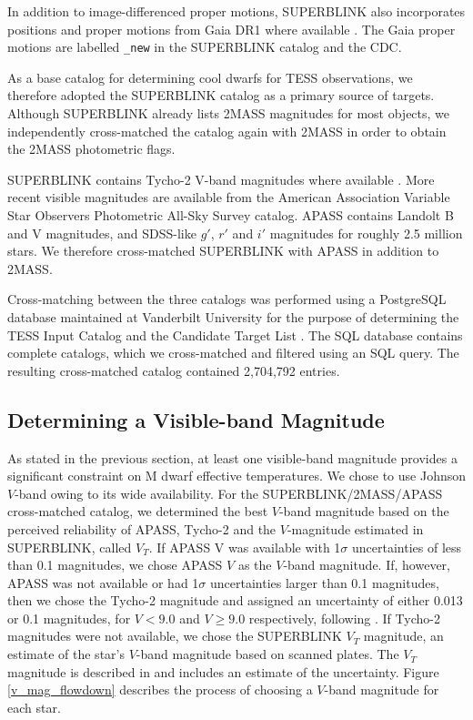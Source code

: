 \documentclass[twocolumn]{aastex62}
\begin{document}
In addition to image-differenced proper motions, SUPERBLINK also incorporates positions and proper motions from Gaia DR1 where available \citep[][]{Gaia2016a, Gaia2016b}.  The Gaia proper motions are labelled {\tt \_new} in the SUPERBLINK catalog and the CDC.

As a base catalog for determining cool dwarfs for TESS observations, we therefore adopted the SUPERBLINK catalog as a primary source of targets.  Although SUPERBLINK already lists 2MASS magnitudes for most objects, we independently cross-matched the catalog again with 2MASS in order to obtain the 2MASS photometric flags.  


SUPERBLINK contains Tycho-2 V-band magnitudes where available \citep[][]{Hog2000}.  More recent visible magnitudes are available from the American Association Variable Star Observers Photometric All-Sky Survey \citep[APASS,][]{Henden2014} catalog.  APASS contains Landolt B and V magnitudes, and SDSS-like $g'$, $r'$ and $i'$ magnitudes for roughly 2.5 million stars.  We therefore cross-matched SUPERBLINK with APASS in addition to 2MASS.

Cross-matching between the three catalogs was performed using a PostgreSQL database maintained at Vanderbilt University for the purpose of determining the TESS Input Catalog and the Candidate Target List \citep[TIC and CTL,][]{Stassun2017}.  The SQL database contains complete catalogs, which we cross-matched and filtered using an SQL query.  The resulting cross-matched catalog contained 2,704,792 entries.

\subsection{Determining a Visible-band Magnitude}\label{sec:vmag}

As stated in the previous section, at least one visible-band magnitude provides a significant constraint on M dwarf effective temperatures.  We chose to use Johnson $V$-band owing to its wide availability.  For the SUPERBLINK/2MASS/APASS cross-matched catalog, we determined the best $V$-band magnitude based on the perceived reliability of APASS, Tycho-2 and the $V$-magnitude estimated in SUPERBLINK, called $V_T$.  If APASS V was available with 1$\sigma$ uncertainties of less than 0.1 magnitudes, we chose APASS $V$ as the $V$-band magnitude.  If, however, APASS was not available or had 1$\sigma$ uncertainties larger than 0.1 magnitudes, then we chose the Tycho-2 magnitude and assigned an uncertainty of either 0.013 or 0.1 magnitudes, for $V<9.0$ and $V \ge 9.0$ respectively, following \citet{Hog2000}.  If Tycho-2 magnitudes were not available, we chose the SUPERBLINK $V_T$ magnitude, an estimate of the star's $V$-band magnitude based on scanned plates.  The $V_T$ magnitude is described in \citet[][]{Lepine2011} and includes an estimate of the uncertainty.  Figure \ref{v_mag_flowdown} describes the process of choosing a $V$-band magnitude for each star.
\end{document}
